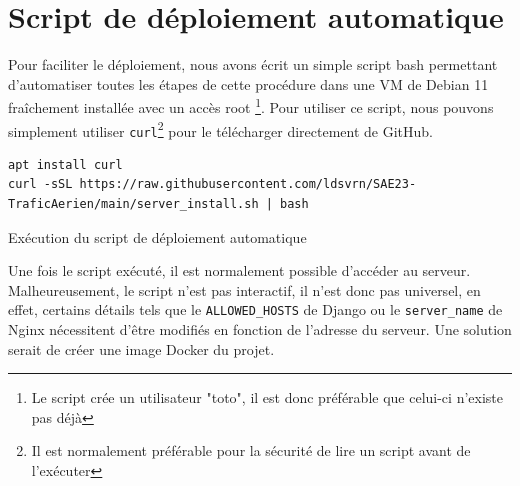 \documentclass{article}
\begin{document}
\section{Script de déploiement automatique}
    Pour faciliter le déploiement, nous avons écrit un simple script bash permettant d'automatiser toutes les étapes de cette procédure dans une VM de Debian 11 fraîchement installée avec un accès root
    \footnote{Le script crée un utilisateur "toto", il est donc préférable que celui-ci n'existe pas déjà}.
    Pour utiliser ce script, nous pouvons simplement utiliser \verb|curl|\footnote{Il est normalement préférable pour la sécurité de lire un script avant de l'exécuter} pour le télécharger directement de GitHub.
    \begin{listing}[H]
        \begin{verbatim}
apt install curl
curl -sSL https://raw.githubusercontent.com/ldsvrn/SAE23-TraficAerien/main/server_install.sh | bash
        \end{verbatim}
        \caption{Exécution du script de déploiement automatique}
        \label{code:script-curl} 
    \end{listing}
    Une fois le script exécuté, il est normalement possible d'accéder au serveur.
    Malheureusement, le script n'est pas interactif, il n'est donc pas universel, en effet, certains détails tels que le \verb|ALLOWED_HOSTS| de Django ou le \verb|server_name| de Nginx nécessitent d'être modifiés en fonction de l'adresse du serveur. Une solution serait de créer une image Docker du projet.
\end{document}
